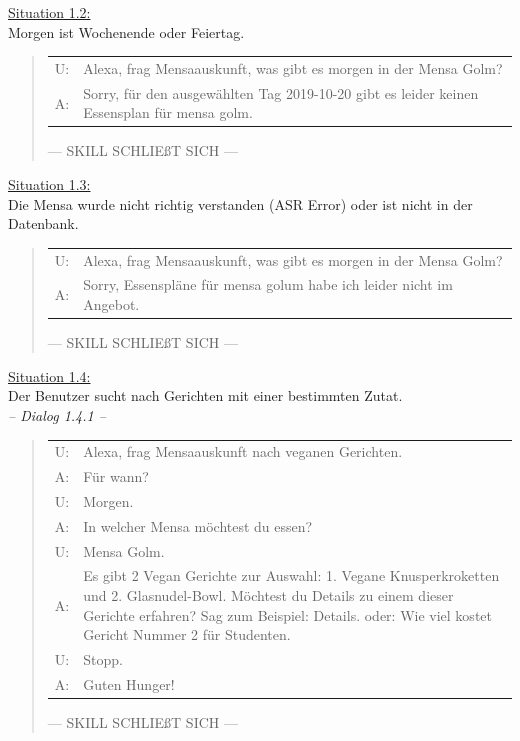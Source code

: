 \documentclass[12pt]{article}
\begin{document}
\ul{Situation 1.2:}\\Morgen ist Wochenende oder Feiertag.
\begin{quote}
\begin{tabular}{lp{12cm}}
  U:& Alexa, frag Mensaauskunft, was gibt es morgen in der Mensa Golm?\\  
  A:& Sorry, für den ausgewählten Tag 2019-10-20 gibt es leider keinen Essensplan für mensa golm.\\[0.2cm]  
\end{tabular}
--- SKILL SCHLIEßT SICH ---\\
\end{quote}

\ul{Situation 1.3:}\\Die Mensa wurde nicht richtig verstanden (ASR Error) oder ist nicht in der Datenbank.

\begin{quote}
\begin{tabular}{lp{12cm}}
  U:& Alexa, frag Mensaauskunft, was gibt es morgen in der Mensa Golm?\\
  A:& Sorry, Essenspläne für mensa golum habe ich leider nicht im Angebot.\\[0.2cm]
\end{tabular}
--- SKILL SCHLIEßT SICH ---\\
\end{quote}

\ul{Situation 1.4:}\\Der Benutzer sucht nach Gerichten mit einer bestimmten Zutat.\\
\emph{-- Dialog 1.4.1 --}
\begin{quote}
\begin{tabular}{lp{12cm}}
  U:& Alexa, frag Mensaauskunft nach veganen Gerichten.\\
  A:& Für wann?\\
  U:& Morgen.\\
  A:& In welcher Mensa möchtest du essen?\\
  U:& Mensa Golm.\\
  A:& Es gibt 2 Vegan Gerichte zur Auswahl: 1. Vegane Knusperkroketten und 2. Glasnudel-Bowl. Möchtest du Details zu einem dieser Gerichte erfahren? Sag zum Beispiel: Details. oder: Wie viel kostet Gericht Nummer 2 für Studenten.\\
  U:& Stopp.\\
  A:& Guten Hunger!\\[0.2cm]
\end{tabular}
--- SKILL SCHLIEßT SICH ---\\
\end{quote}
\end{document}
